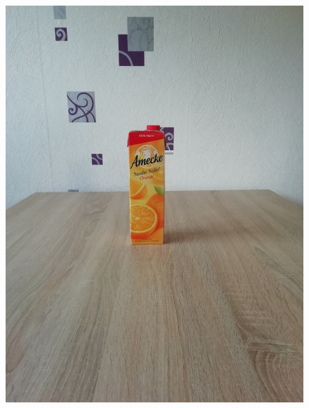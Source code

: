 \begin{figure}[htb]
\begin{minipage}[c]{0.2\textwidth}
\includegraphics[width=\textwidth]{Sources/Bild1.jpg}
\end{minipage}
\hfill
\begin{minipage}[c]{0.08\textwidth}

\end{minipage}
\end{figure}
